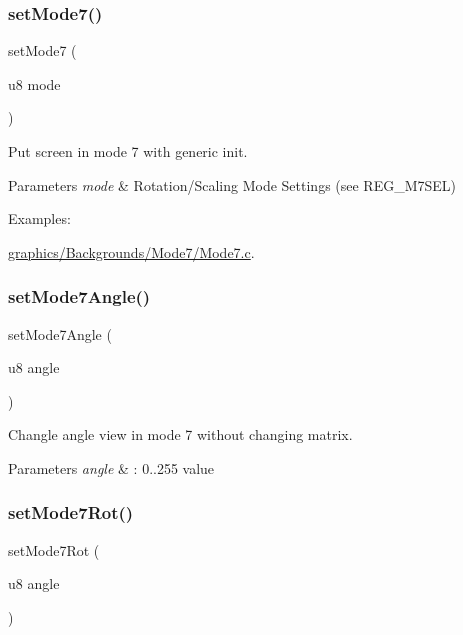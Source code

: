 \subsubsection{\texorpdfstring{set\+Mode7()}{setMode7()}}
{\footnotesize\ttfamily set\+Mode7 (\begin{DoxyParamCaption}\item[{u8}]{mode }\end{DoxyParamCaption})}



Put screen in mode 7 with generic init. 


\begin{DoxyParams}{Parameters}
{\em mode} & Rotation/\+Scaling Mode Settings (see R\+E\+G\+\_\+\+M7\+S\+EL) \\
\hline
\end{DoxyParams}
\begin{Desc}
\item[Examples\+: ]\par
\hyperlink{a00417}{graphics/\+Backgrounds/\+Mode7/\+Mode7.\+c}.\end{Desc}
\mbox{\label{a00368_ac4b1645f376fa266f0e614a1d7903a31}} 
\subsubsection{\texorpdfstring{set\+Mode7\+Angle()}{setMode7Angle()}}
{\footnotesize\ttfamily set\+Mode7\+Angle (\begin{DoxyParamCaption}\item[{u8}]{angle }\end{DoxyParamCaption})}



Changle angle view in mode 7 without changing matrix. 


\begin{DoxyParams}{Parameters}
{\em angle} & \+: 0..255 value \\
\hline
\end{DoxyParams}
\mbox{\label{a00368_a4d332cdc88b26fc9ec2cdd4f6710ce8c}} 
\subsubsection{\texorpdfstring{set\+Mode7\+Rot()}{setMode7Rot()}}
{\footnotesize\ttfamily set\+Mode7\+Rot (\begin{DoxyParamCaption}\item[{u8}]{angle }\end{DoxyParamCaption})}



